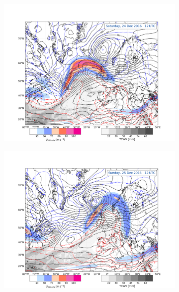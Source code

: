 \begin{figure}\ContinuedFloat
	\centering
    \begin{subfigure}[b]{0.49\textwidth}
        \includegraphics[trim={4.2cm 3.9cm 4.3cm 5.1cm},clip,
        width=\textwidth]{./fig_Geopot_Jet/20161224_12}
        \caption{}\label{fig:GP24}
    \end{subfigure}
    \begin{subfigure}[b]{0.49\textwidth}
        \includegraphics[trim={4.2cm 3.9cm 4.3cm 5.1cm},clip,
        width=\textwidth]{./fig_Geopot_Jet/20161225_12}
        \caption{}\label{fig:GP25}

\end{subfigure}
\end{figure}
